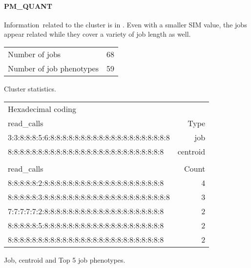 \documentclass{jhps}
\begin{document}
\paragraph{PM\_QUANT}
Information\ related to the cluster is in .
Even with a smaller SIM value, the jobs appear related while they cover a variety of job length as well.

\noindent\begin{minipage}{\textwidth}
\captionsetup{type=table}

\begingroup
  \begin{subtable}{\textwidth}
  \centering
  \begin{tabular}{ll}
    Number of jobs      & 68  \\
    Number of job phenotypes & 59  \\
  \end{tabular}
  \caption{Cluster statistics.}
  \label{tab:use_case:pm_quant:stats}
  \end{subtable}
\endgroup

\medskip

\begingroup
  \begin{subtable}{\textwidth}
  \centering
  \begin{tiny}
    \begin{tabular}{l|r}
      \rowcolor{tblhead}
      Hexadecimal coding & \\
      \rowcolor{tblhead}
      read\_calls                                           & Type     \\
      \hline
      3:3:8:8:8:5:6:8:8:8:8:8:8:8:8:8:8:8:8:8:8:8:8:8:8:8:8 & job      \\
      8:8:8:8:8:8:8:8:8:8:8:8:8:8:8:8:8:8:8:8:8:8:8:8:8:8   & centroid \\
      \multicolumn{2}{l}{}\\
      \rowcolor{tblhead}
      read\_calls                                           & Count    \\
      \hline
      8:8:8:8:8:2:8:8:8:8:8:8:8:8:8:8:8:8:8:8:8:8:8:8:8:8   & 4        \\
      8:8:8:8:8:3:8:8:8:8:8:8:8:8:8:8:8:8:8:8:8:8:8:8:8:8:8 & 3        \\
      7:7:7:7:7:2:8:8:8:8:8:8:8:8:8:8:8:8:8:8:8:8:8:8:8:8   & 2        \\
      8:8:8:8:8:5:8:8:8:8:8:8:8:8:8:8:8:8:8:8:8:8:8:8:8:8   & 2        \\
      8:8:8:8:8:8:8:8:8:8:8:8:8:8:8:8:8:8:8:8:8:8:8:8:8:8   & 2        \\
    \end{tabular}
  \end{tiny}
  \caption{Job, centroid and Top 5 job phenotypes.}
  \label{tab:use_case:pm_quant:top_jobs}
  \end{subtable}
\endgroup


\end{minipage}
\end{document}
